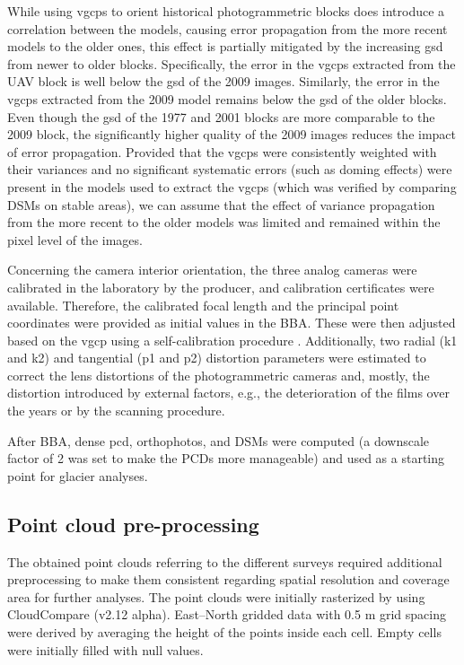 While using \acp{vgcp} to orient historical photogrammetric blocks does introduce a correlation between the models, causing error propagation from the more recent models to the older ones, this effect is partially mitigated by the increasing \ac{gsd} from newer to older blocks.
Specifically, the error in the \acp{vgcp} extracted from the UAV block is well below the \ac{gsd} of the 2009 images. 
Similarly, the error in the \acp{vgcp} extracted from the 2009 model remains below the \ac{gsd} of the older blocks. 
Even though the \ac{gsd} of the 1977 and 2001 blocks are more comparable to the 2009 block, the significantly higher quality of the 2009 images reduces the impact of error propagation.
Provided that the \acp{vgcp} were consistently weighted with their variances and no significant systematic errors (such as doming effects) were present in the models used to extract the \acp{vgcp} (which was verified by comparing DSMs on stable areas), we can assume that the effect of variance propagation from the more recent to the older models was limited and remained within the pixel level of the images.

Concerning the camera interior orientation, the three analog cameras were calibrated in the laboratory by the producer, and calibration certificates were available. 
Therefore, the calibrated focal length and the principal point coordinates were provided as initial values in the BBA. 
These were then adjusted based on the {vgcp} using a self-calibration procedure \citep{jacobsen2004issues}. 
Additionally, two radial (k1 and k2) and tangential (p1 and p2) distortion parameters were estimated to correct the lens distortions of the photogrammetric cameras and, mostly, the distortion introduced by external factors, e.g., the deterioration of the films over the years or by the scanning procedure.

After BBA, dense \ac{pcd}, orthophotos, and DSMs were computed (a downscale factor of 2 was set to make the PCDs more manageable) and used as a starting point for glacier analyses.

\subsection{Point cloud pre-processing}\label{sec:2:pcd_preproc}

The obtained point clouds referring to the different surveys required additional preprocessing to make them consistent regarding spatial resolution and coverage area for further analyses.
The point clouds were initially rasterized by using CloudCompare (v2.12 alpha).
East–North gridded data with 0.5 m grid spacing were derived by averaging the height of the points inside each cell. 
Empty cells were initially filled with null values.

